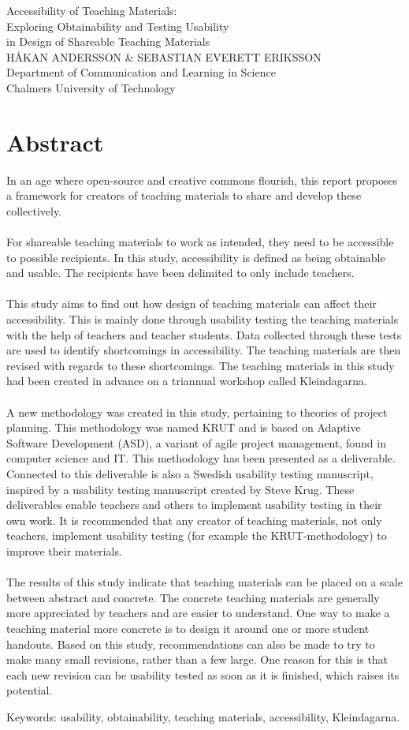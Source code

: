 Accessibility of Teaching Materials:\\
Exploring Obtainability and Testing Usability\\ in Design of Shareable Teaching Materials\\
HÅKAN ANDERSSON \& SEBASTIAN EVERETT ERIKSSON\\
Department of Communication and Learning in Science\\
Chalmers University of Technology \setlength{\parskip}{0.5cm}

\thispagestyle{plain}			%
\setlength{\parskip}{0pt plus 1.0pt}
\section*{Abstract}
In an age where open-source and creative commons flourish, this report proposes a framework for creators of teaching materials to share and develop these collectively.
\\ \\
For shareable teaching materials to work as intended, they need to be accessible to possible recipients. In this study, accessibility is defined as being obtainable and usable. The recipients have been delimited to only include teachers.
\\ \\
This study aims to find out how design of teaching materials can affect their accessibility. This is mainly done through usability testing the teaching materials with the help of teachers and teacher students. Data collected through these tests are used to identify shortcomings in accessibility. The teaching materials are then revised with regards to these shortcomings. The teaching materials in this study had been created in advance on a triannual workshop called Kleindagarna.
\\ \\
A new methodology was created in this study, pertaining to theories of project planning. This methodology was named KRUT and is based on Adaptive Software Development (ASD), a variant of agile project management, found in computer science and IT. This methodology has been presented as a deliverable. Connected to this deliverable is also a Swedish usability testing manuscript, inspired by a usability testing manuscript created by Steve Krug. These deliverables enable teachers and others to implement usability testing in their own work. It is recommended that any creator of teaching materials, not only teachers, implement usability testing (for example the KRUT-methodology) to improve their materials.
\\ \\
The results of this study indicate that teaching materials can be placed on a scale between abstract and concrete. The concrete teaching materials are generally more appreciated by teachers and are easier to understand. One way to make a teaching material more concrete is to design it around one or more student handouts. Based on this study, recommendations can also be made to try to make many small revisions, rather than a few large. One reason for this is that each new revision can be usability tested as soon as it is finished, which raises its potential. 


\vfill
Keywords: usability, obtainability, teaching materials, accessibility, Kleindagarna.

\newpage				%
\thispagestyle{empty}
\mbox{}